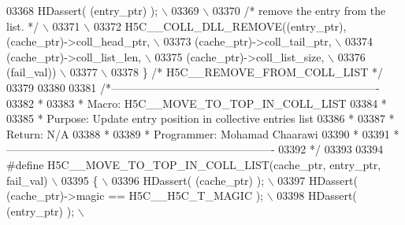 \begin{DoxyCode}
03368 \textcolor{preprocessor}{    HDassert( (entry\_ptr) );                                            \(\backslash\)}
03369 \textcolor{preprocessor}{                                                                        \(\backslash\)}
03370 \textcolor{preprocessor}{    }\textcolor{comment}{/* remove the entry from the list. */}\textcolor{preprocessor}{                               \(\backslash\)}
03371 \textcolor{preprocessor}{                                                                        \(\backslash\)}
03372 \textcolor{preprocessor}{    H5C\_\_COLL\_DLL\_REMOVE((entry\_ptr), (cache\_ptr)->coll\_head\_ptr,       \(\backslash\)}
03373 \textcolor{preprocessor}{                         (cache\_ptr)->coll\_tail\_ptr,                    \(\backslash\)}
03374 \textcolor{preprocessor}{                         (cache\_ptr)->coll\_list\_len,                    \(\backslash\)}
03375 \textcolor{preprocessor}{                         (cache\_ptr)->coll\_list\_size,                   \(\backslash\)}
03376 \textcolor{preprocessor}{                         (fail\_val))                                    \(\backslash\)}
03377 \textcolor{preprocessor}{                                                                        \(\backslash\)}
03378 \textcolor{preprocessor}{\} }\textcolor{comment}{/* H5C\_\_REMOVE\_FROM\_COLL\_LIST */}\textcolor{preprocessor}{}
03379 
03380 
03381 \textcolor{comment}{/*-------------------------------------------------------------------------}
03382 \textcolor{comment}{ *}
03383 \textcolor{comment}{ * Macro:   H5C\_\_MOVE\_TO\_TOP\_IN\_COLL\_LIST}
03384 \textcolor{comment}{ *}
03385 \textcolor{comment}{ * Purpose:     Update entry position in collective entries list}
03386 \textcolor{comment}{ *}
03387 \textcolor{comment}{ * Return:      N/A}
03388 \textcolor{comment}{ *}
03389 \textcolor{comment}{ * Programmer:  Mohamad Chaarawi}
03390 \textcolor{comment}{ *}
03391 \textcolor{comment}{ *-------------------------------------------------------------------------}
03392 \textcolor{comment}{ */}
03393 
03394 \textcolor{preprocessor}{#define H5C\_\_MOVE\_TO\_TOP\_IN\_COLL\_LIST(cache\_ptr, entry\_ptr, fail\_val)   \(\backslash\)}
03395 \textcolor{preprocessor}{\{                                                                       \(\backslash\)}
03396 \textcolor{preprocessor}{    HDassert( (cache\_ptr) );                                            \(\backslash\)}
03397 \textcolor{preprocessor}{    HDassert( (cache\_ptr)->magic == H5C\_\_H5C\_T\_MAGIC );                 \(\backslash\)}
03398 \textcolor{preprocessor}{    HDassert( (entry\_ptr) );                                            \(\backslash\)}

\end{DoxyCode}
